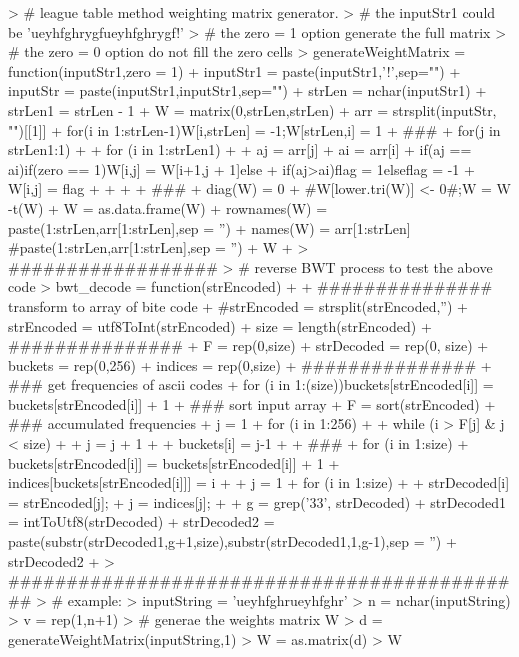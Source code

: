 \documentclass{article}
\begin{document}
\begin{Schunk}
\begin{Sinput}
> # league table  method weighting matrix generator.
> # the inputStr1 could be 'ueyhfghrygfueyhfghrygf!'
> # the zero = 1 option generate the full matrix
> # the zero = 0 option do not fill the zero cells
> generateWeightMatrix = function(inputStr1,zero = 1){
+   inputStr1 = paste(inputStr1,'!',sep="")
+   inputStr = paste(inputStr1,inputStr1,sep="")
+   strLen = nchar(inputStr1)
+   strLen1 = strLen - 1
+   W = matrix(0,strLen,strLen)
+   arr = strsplit(inputStr, "")[[1]]
+   for(i in 1:strLen-1){W[i,strLen] = -1;W[strLen,i] = 1}
+   ###
+   for(j in strLen1:1)
+   {
+     for (i in 1:strLen1)
+       {
+       aj = arr[j]
+       ai = arr[i]
+       if(aj == ai){if(zero == 1){W[i,j] = W[i+1,j + 1]}}else{
+         if(aj>ai){flag = 1}else{flag = -1}
+         W[i,j] = flag
+       }
+     }
+   }
+   ###
+   diag(W) = 0
+   #W[lower.tri(W)] <- 0#;W = W -t(W)
+   W = as.data.frame(W)
+   rownames(W) = paste(1:strLen,arr[1:strLen],sep = '')
+   names(W) = arr[1:strLen] #paste(1:strLen,arr[1:strLen],sep = '')
+   W
+ }
> ##################
> # reverse BWT process to test the above code
> bwt_decode = function(strEncoded)
+ {
+   ############### transform to array of bite code
+   #strEncoded = strsplit(strEncoded,'')
+   strEncoded = utf8ToInt(strEncoded)
+   size = length(strEncoded)
+   ###############
+   F = rep(0,size)
+   strDecoded = rep(0, size)
+   buckets = rep(0,256)
+   indices = rep(0,size)
+   ###############
+   ### get frequencies of ascii codes
+   for (i in 1:(size)){buckets[strEncoded[i]] = buckets[strEncoded[i]] + 1}
+   ### sort input array
+   F = sort(strEncoded)
+   ### accumulated frequencies
+   j = 1
+   for (i in 1:256)
+   {
+     while (i > F[j] & j < size)
+     {
+       j = j + 1
+     }
+     buckets[i] = j-1
+   }
+   ### 
+   for (i in 1:size){
+     buckets[strEncoded[i]] = buckets[strEncoded[i]] + 1
+     indices[buckets[strEncoded[i]]] = i
+   }
+   j = 1
+   for (i in 1:size)
+   {
+     strDecoded[i] = strEncoded[j];
+     j = indices[j];
+   }
+   g = grep('33', strDecoded)
+   strDecoded1 = intToUtf8(strDecoded)
+   strDecoded2 = paste(substr(strDecoded1,g+1,size),substr(strDecoded1,1,g-1),sep = '')
+   strDecoded2
+ }
> #############################################
> # example:
> inputString = 'ueyhfghrueyhfghr'
> n = nchar(inputString)
> v = rep(1,n+1)
> # generae the weights matrix W
> d = generateWeightMatrix(inputString,1)
> W = as.matrix(d)
> W
\end{Sinput}
\begin{Soutput}

\end{Soutput}
\end{Schunk}
\end{document}
